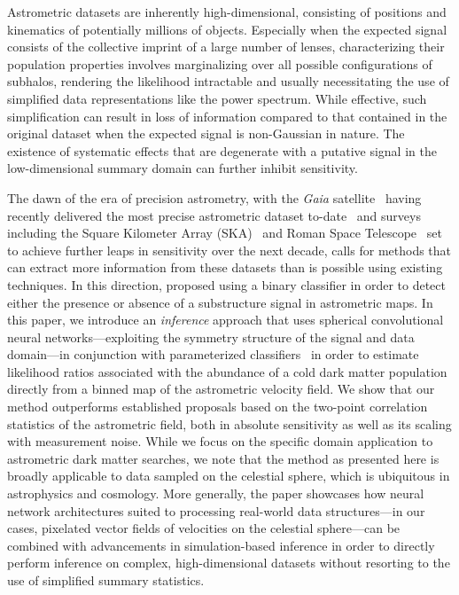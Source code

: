 \documentclass[twocolumn]{aastex631}
\begin{document}
Astrometric datasets are inherently high-dimensional, consisting of positions and kinematics of potentially millions of objects. Especially when the expected signal consists of the collective imprint of a large number of lenses, characterizing their population properties involves marginalizing over all possible configurations of subhalos, rendering the likelihood intractable and usually necessitating the use of simplified data representations like the power spectrum. While effective, such simplification can result in loss of information compared to that contained in the original dataset when the expected signal is non-Gaussian in nature. The existence of systematic effects that are degenerate with a putative signal in the low-dimensional summary domain can further inhibit sensitivity. 

The dawn of the era of precision astrometry, with the \emph{Gaia} satellite~\citep{2016A&A...595A...1G} having recently delivered the most precise astrometric dataset to-date~\citep{2018A&A...616A...1G,2018A&A...616A...2L,2021A&A...649A...1G} and surveys including the Square Kilometer Array (SKA)~\citep{Fomalont:2004hr,Jarvis:2015tqa} and Roman Space Telescope~\citep{2019JATIS...5d4005W,2013arXiv1305.5425S,2019arXiv190205569A} set to achieve further leaps in sensitivity over the next decade, calls for methods that can extract more information from these datasets than is possible using existing techniques. In this direction, \citet{Vattis:2020kaa} proposed using a binary classifier in order to detect either the presence or absence of a substructure signal in astrometric maps. In this paper, we introduce an \emph{inference} approach that uses spherical convolutional neural networks---exploiting the symmetry structure of the signal and data domain---in conjunction with parameterized classifiers~\citep{Cranmer:2015bka,Baldi:2016fzo} in order to estimate likelihood ratios associated with the abundance of a cold dark matter population directly from a binned map of the astrometric velocity field. 
We show that our method outperforms established proposals based on the two-point correlation statistics of the astrometric field, both in absolute sensitivity as well as its scaling with measurement noise. 
{While we focus on the specific domain application to astrometric dark matter searches, we note that the method as presented here is broadly applicable to data sampled on the celestial sphere, which is ubiquitous in astrophysics and cosmology. More generally, the paper showcases how neural network architectures suited to processing real-world data structures---in our cases, pixelated vector fields of velocities on the celestial sphere---can be combined with advancements in simulation-based inference in order to directly perform inference on complex, high-dimensional datasets without resorting to the use of simplified summary statistics.}
\end{document}
